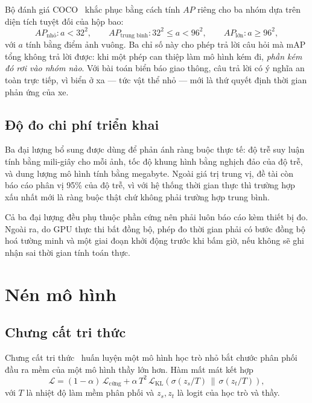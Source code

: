 Bộ đánh giá COCO~\cite{lin2014coco} khắc phục bằng cách tính $AP$ riêng cho ba nhóm dựa trên diện
tích tuyệt đối của hộp bao:
\begin{equation}
\label{eq:apsize}
AP_{\text{nhỏ}}: a < 32^2, \qquad
AP_{\text{trung bình}}: 32^2 \le a < 96^2, \qquad
AP_{\text{lớn}}: a \ge 96^2,
\end{equation}
với $a$ tính bằng điểm ảnh vuông. Ba chỉ số này cho phép trả lời câu hỏi mà mAP tổng không trả lời
được: khi một phép can thiệp làm mô hình kém đi, \emph{phần kém đó rơi vào nhóm nào}. Với bài toán
biển báo giao thông, câu trả lời có ý nghĩa an toàn trực tiếp, vì biển ở xa --- tức vật thể nhỏ ---
mới là thứ quyết định thời gian phản ứng của xe.

\subsection{Độ đo chi phí triển khai}

Ba đại lượng bổ sung được dùng để phản ánh ràng buộc thực tế: độ trễ suy luận tính bằng mili-giây
cho mỗi ảnh, tốc độ khung hình bằng nghịch đảo của độ trễ, và dung lượng mô hình tính bằng
megabyte. Ngoài giá trị trung vị, đề tài còn báo cáo phân vị 95\% của độ trễ, vì với hệ thống thời
gian thực thì trường hợp xấu nhất mới là ràng buộc thật chứ không phải trường hợp trung bình.

Cả ba đại lượng đều phụ thuộc phần cứng nên phải luôn báo cáo kèm thiết bị đo. Ngoài ra, do GPU
thực thi bất đồng bộ, phép đo thời gian phải có bước đồng bộ hoá tường minh và một giai đoạn khởi
động trước khi bấm giờ, nếu không sẽ ghi nhận sai thời gian tính toán thực.

\section{Nén mô hình}

\subsection{Chưng cất tri thức}
\label{sec:kd_lythuyet}

Chưng cất tri thức~\cite{hinton2015distillation} huấn luyện một mô hình học trò nhỏ bắt chước phân
phối đầu ra mềm của một mô hình thầy lớn hơn. Hàm mất mát kết hợp
\begin{equation}
\label{eq:distill}
\mathcal{L} = (1-\alpha)\,\mathcal{L}_{\text{cứng}}
            + \alpha\, T^{2}\, \mathcal{L}_{\text{KL}}\!\left(\sigma(z_s/T) \,\|\, \sigma(z_t/T)\right),
\end{equation}
với $T$ là nhiệt độ làm mềm phân phối và $z_s, z_t$ là logit của học trò và thầy.

